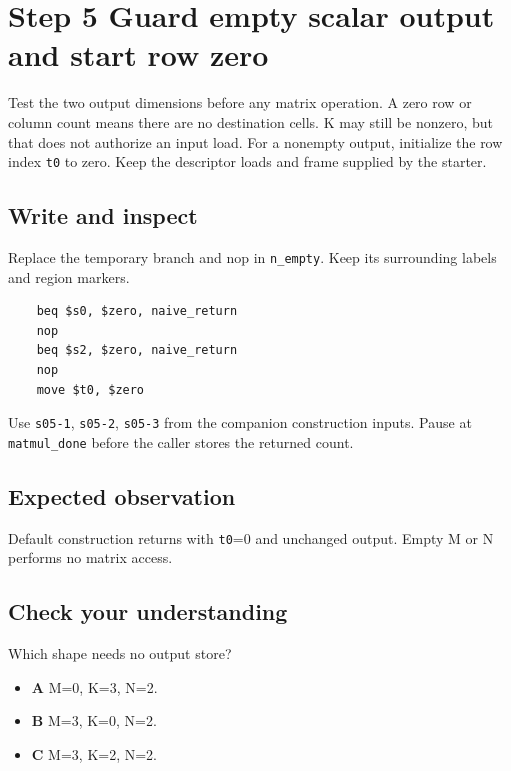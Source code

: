 \section{Step 5 Guard empty scalar output and start row zero}\label{matmul-s05}

Test the two output dimensions before any matrix operation. A zero row or column count means there are no destination cells. K may still be nonzero, but that does not authorize an input load. For a nonempty output, initialize the row index \texttt{t0} to zero. Keep the descriptor loads and frame supplied by the starter.

\subsection{Write and inspect}
Replace the temporary branch and nop in \texttt{n\_empty}. Keep its surrounding labels and region markers.

\begin{verbatim}
    beq $s0, $zero, naive_return
    nop
    beq $s2, $zero, naive_return
    nop
    move $t0, $zero
\end{verbatim}
Use \texttt{s05-1}, \texttt{s05-2}, \texttt{s05-3} from the companion construction inputs. Pause at \texttt{matmul\_done} before the caller stores the returned count.

\subsection{Expected observation}
Default construction returns with \texttt{t0}=0 and unchanged output. Empty M or N performs no matrix access.

\subsection{Check your understanding}
Which shape needs no output store?

\begin{itemize}
\item \textbf{A} M=0, K=3, N=2.
\item \textbf{B} M=3, K=0, N=2.
\item \textbf{C} M=3, K=2, N=2.
\end{itemize}
